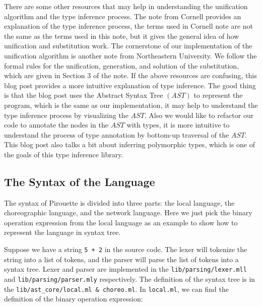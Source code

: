 \documentclass{article}
\begin{document}
    There are some other resources that may help in understanding the unification algorithm and the type inference process.
    The note from Cornell\cite{Cornell} provides an explanation of the type inference process,
    the terms used in Cornell note are not the same as the terms used in this note, but it gives the general idea of how unification and substitution work.
    The cornerstone of our implementation of the unification algorithm is another note from Northeastern University\cite{NEU2}.
    We follow the formal rules for the unification, generation, and solution of the substitution, which are given in Section 3 of the note.
    If the above resources are confusing, this blog post\cite{TypInferBlog} provides a more intuitive explanation of type inference.
    The good thing is that the blog post uses the Abstract Syntax Tree $(AST)$\cite{ASTBlog} to represent the program,
    which is the same as our implementation, it may help to understand the type inference process by visualizing the $AST$.
    Also we would like to refactor our code to annotate the nodes in the $AST$ with types, it is more intuitive to understand
    the process of type annotation by bottom-up traversal of the $AST$. This blog post also talks a bit about inferring polymorphic types,
    which is one of the goals of this type inference library.


\subsection{The Syntax of the Language}
    The syntax of Pirouette is divided into three parts: the local language, the choreographic language, and the network language.
    Here we just pick the binary operation expression from the local language as an example to show how to represent the language in syntax tree.

    Suppose we have a string \texttt{5 + 2} in the source code.
    The lexer will tokenize the string into a list of tokens, and the parser will parse the list of tokens into a syntax tree.
    Lexer and parser are implemented in the \texttt{lib/parsing/lexer.mll} and \texttt{lib/parsing/parser.mly} respectively.
    The definition of the syntax tree is in the \texttt{lib/ast\_core/local.ml \& choreo.ml}. In \texttt{local.ml},
    we can find the definition of the binary operation expression:

    \begin{center}
        \setlength{\fboxsep}{5pt}
    \end{center}
\end{document}
